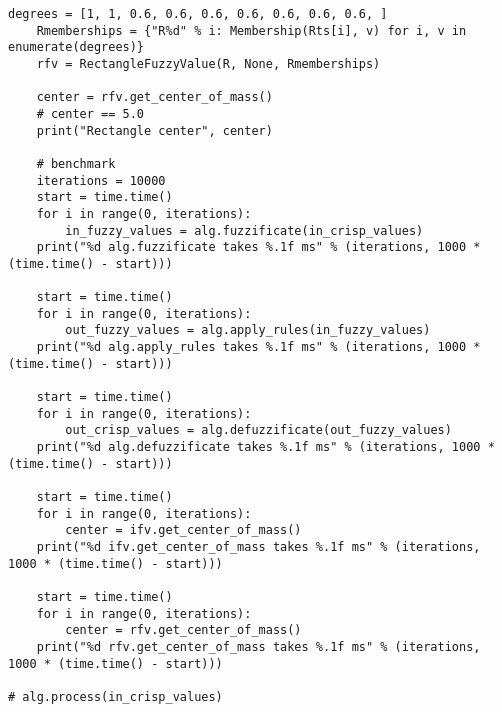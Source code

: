 \begin{lstlisting}[style=pythonstyle,caption={ }, label=lst:func:1]
	degrees = [1, 1, 0.6, 0.6, 0.6, 0.6, 0.6, 0.6, 0.6, ]
	Rmemberships = {"R%d" % i: Membership(Rts[i], v) for i, v in enumerate(degrees)}
	rfv = RectangleFuzzyValue(R, None, Rmemberships)

	center = rfv.get_center_of_mass()
	# center == 5.0
	print("Rectangle center", center)

	# benchmark
	iterations = 10000
	start = time.time()
	for i in range(0, iterations):
		in_fuzzy_values = alg.fuzzificate(in_crisp_values)
	print("%d alg.fuzzificate takes %.1f ms" % (iterations, 1000 * (time.time() - start)))

	start = time.time()
	for i in range(0, iterations):
		out_fuzzy_values = alg.apply_rules(in_fuzzy_values)
	print("%d alg.apply_rules takes %.1f ms" % (iterations, 1000 * (time.time() - start)))

	start = time.time()
	for i in range(0, iterations):
		out_crisp_values = alg.defuzzificate(out_fuzzy_values)
	print("%d alg.defuzzificate takes %.1f ms" % (iterations, 1000 * (time.time() - start)))

	start = time.time()
	for i in range(0, iterations):
		center = ifv.get_center_of_mass()
	print("%d ifv.get_center_of_mass takes %.1f ms" % (iterations, 1000 * (time.time() - start)))

	start = time.time()
	for i in range(0, iterations):
		center = rfv.get_center_of_mass()
	print("%d rfv.get_center_of_mass takes %.1f ms" % (iterations, 1000 * (time.time() - start)))

# alg.process(in_crisp_values)

\end{lstlisting}
